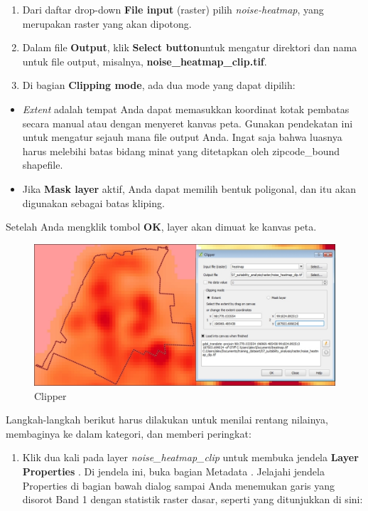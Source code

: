 \documentclass[]{book}
\providecommand{\tightlist}{%
  \setlength{\itemsep}{0pt}\setlength{\parskip}{0pt}}
\begin{document}
\begin{enumerate}
\def\labelenumi{\arabic{enumi}.}
\item
  Dari daftar drop-down \textbf{File input} (raster) pilih \emph{noise-heatmap}, yang merupakan raster yang akan dipotong.
\item
  Dalam file \textbf{Output}, klik \textbf{Select button}untuk mengatur direktori dan nama untuk file output, misalnya, \textbf{noise\_heatmap\_clip.tif}.
\item
  Di bagian \textbf{Clipping mode}, ada dua mode yang dapat dipilih:
\end{enumerate}

\begin{itemize}
\item
  \emph{Extent} adalah tempat Anda dapat memasukkan koordinat kotak pembatas secara manual atau dengan menyeret kanvas peta. Gunakan pendekatan ini untuk mengatur sejauh mana file output Anda. Ingat saja bahwa luasnya harus melebihi batas bidang minat yang ditetapkan oleh zipcode\_bound shapefile.
\item
  Jika \textbf{Mask layer} aktif, Anda dapat memilih bentuk poligonal, dan itu akan digunakan sebagai batas kliping.
\end{itemize}

Setelah Anda mengklik tombol \textbf{OK}, layer akan dimuat ke kanvas peta.

\begin{figure}

{\centering \includegraphics[width=0.7\linewidth]{images/04/fig35} 

}

\caption{Clipper}\label{fig:fig1435}
\end{figure}

Langkah-langkah berikut harus dilakukan untuk menilai rentang nilainya, membaginya ke dalam kategori, dan memberi peringkat:

\begin{enumerate}
\def\labelenumi{\arabic{enumi}.}
\tightlist
\item
  Klik dua kali pada layer \emph{noise\_heatmap\_clip} untuk membuka jendela \textbf{Layer Properties} . Di jendela ini, buka bagian Metadata . Jelajahi jendela Properties di bagian bawah dialog sampai Anda menemukan garis yang disorot Band 1 dengan statistik raster dasar, seperti yang ditunjukkan di sini:
\end{enumerate}
\end{document}
